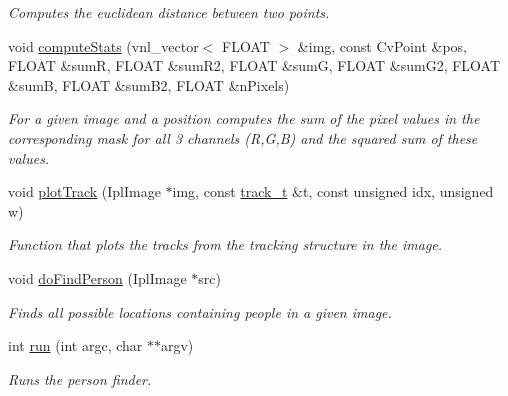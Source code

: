 \begin{DoxyCompactItemize}
\begin{DoxyCompactList}\small\item\em Computes the euclidean distance between two points. \item\end{DoxyCompactList}\item 
\hypertarget{classfindperson_a2de4b333ccb9d7ef8251bb9e37cc1b67}{
void \hyperlink{classfindperson_a2de4b333ccb9d7ef8251bb9e37cc1b67}{computeStats} (vnl\_\-vector$<$ FLOAT $>$ \&img, const CvPoint \&pos, FLOAT \&sumR, FLOAT \&sumR2, FLOAT \&sumG, FLOAT \&sumG2, FLOAT \&sumB, FLOAT \&sumB2, FLOAT \&nPixels)}
\label{classfindperson_a2de4b333ccb9d7ef8251bb9e37cc1b67}

\begin{DoxyCompactList}\small\item\em For a given image and a position computes the sum of the pixel values in the corresponding mask for all 3 channels (R,G,B) and the squared sum of these values. \item\end{DoxyCompactList}\item 
\hypertarget{classfindperson_abbe593e6141fbed267f5c2cac102edfe}{
void \hyperlink{classfindperson_abbe593e6141fbed267f5c2cac102edfe}{plotTrack} (IplImage $\ast$img, const \hyperlink{structtrack__t}{track\_\-t} \&t, const unsigned idx, unsigned w)}
\label{classfindperson_abbe593e6141fbed267f5c2cac102edfe}

\begin{DoxyCompactList}\small\item\em Function that plots the tracks from the tracking structure in the image. \item\end{DoxyCompactList}\item 
\hypertarget{classfindperson_a9caac1c8c591b735d97d7346f3e33232}{
void \hyperlink{classfindperson_a9caac1c8c591b735d97d7346f3e33232}{doFindPerson} (IplImage $\ast$src)}
\label{classfindperson_a9caac1c8c591b735d97d7346f3e33232}

\begin{DoxyCompactList}\small\item\em Finds all possible locations containing people in a given image. \item\end{DoxyCompactList}\item 
int \hyperlink{classfindperson_ac1f545534cdaab9094198a5dc2c2a79f}{run} (int argc, char $\ast$$\ast$argv)
\begin{DoxyCompactList}\small\item\em Runs the person finder. \item\end{DoxyCompactList}\end{DoxyCompactItemize}
